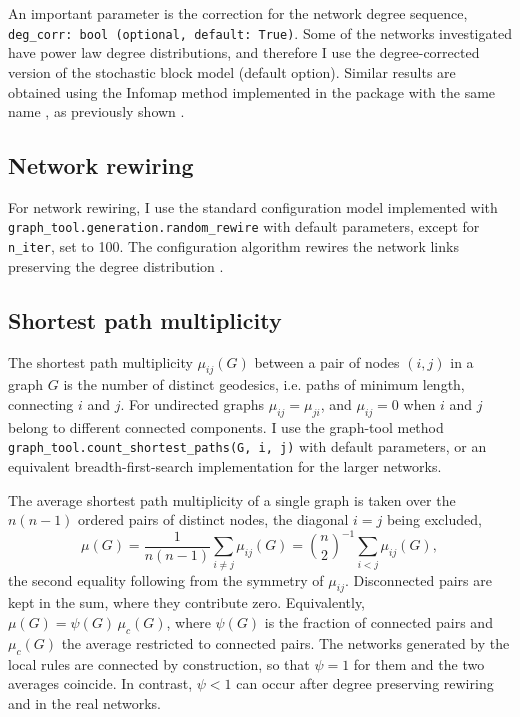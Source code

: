 \documentclass[reprint,aps,pre,amsmath,amssymb,superscriptaddress,showpacs]{revtex4-1}
\begin{document}
An important parameter is the correction for the network degree sequence, \verb| deg_corr: bool (optional, default: True)|. Some of the networks investigated have power law degree distributions, and therefore I use the degree-corrected version of the stochastic block model (default option). Similar results are obtained using the Infomap method implemented in the package with the same name \cite{mapequation2025software}, as previously shown \cite{vazquez2025local}.

\subsection{Network rewiring}

For network rewiring, I use the standard configuration model implemented with \verb|graph_tool.generation.random_rewire| with default parameters, except for \verb|n_iter|, set to 100. The configuration algorithm rewires the network links preserving the degree distribution \cite{configuration_method_park_2004}.

\subsection{Shortest path multiplicity}

The shortest path multiplicity $\mu_{ij}(G)$ between a pair of nodes $(i,j)$ in a graph $G$ is the number of distinct geodesics, i.e. paths of minimum length, connecting $i$ and $j$. For undirected graphs $\mu_{ij}=\mu_{ji}$, and $\mu_{ij}=0$ when $i$ and $j$ belong to different connected components. I use the graph-tool method \verb|graph_tool.count_shortest_paths(G, i, j)| with default parameters, or an equivalent breadth-first-search implementation for the larger networks.

The average shortest path multiplicity of a single graph is taken over the $n(n-1)$ ordered pairs of distinct nodes, the diagonal $i=j$ being excluded,
%
\begin{equation}
\mu(G) = \frac{1}{n(n-1)}\sum_{i\neq j}\mu_{ij}(G) = \binom{n}{2}^{-1}\sum_{i< j}\mu_{ij}(G),
\label{mu_def}
\end{equation}
%
the second equality following from the symmetry of $\mu_{ij}$. Disconnected pairs are kept in the sum, where they contribute zero. Equivalently, $\mu(G) = \psi(G)\, \mu_c(G)$, where $\psi(G)$ is the fraction of connected pairs and $\mu_c(G)$ the average restricted to connected pairs. The networks generated by the local rules are connected by construction, so that $\psi=1$ for them and the two averages coincide. In contrast, $\psi<1$ can occur after degree preserving rewiring and in the real networks.
\end{document}
